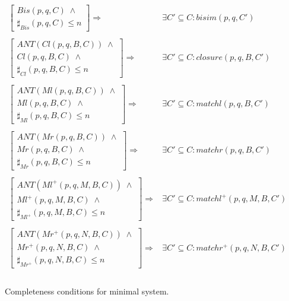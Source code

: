 \begin{figure}
\[
\begin{array}{ll}
\left[\begin{array}{l}Bis(p,q,C)\;\wedge\\ \sharp_{Bis}(p,q,C)\leq n\end{array}\right] \Rightarrow
& \exists C'\subseteq C: bisim(p,q,C')\\
\\

\left[\begin{array}{l}ANT(Cl(p,q,B,C))\;\wedge\\ Cl(p,q,B,C)\;\wedge\\ \sharp_{Cl}(p,q,B,C)\leq n\end{array}\right] \Rightarrow
& \exists C'\subseteq C: closure(p,q,B,C')\\
\\

\left[\begin{array}{l}ANT(Ml(p,q,B,C))\;\wedge\\ Ml(p,q,B,C)\;\wedge\\ \sharp_{Ml}(p,q,B,C)\leq n\end{array}\right] \Rightarrow
& \exists C'\subseteq C: matchl(p,q,B,C')\\
\\

\left[\begin{array}{l}ANT(Mr(p,q,B,C))\;\wedge\\ Mr(p,q,B,C)\;\wedge\\ \sharp_{Mr}(p,q,B,C)\leq n\end{array}\right] \Rightarrow
& \exists C'\subseteq C: matchr(p,q,B,C')\\
\\

\left[\begin{array}{l}ANT(Ml^{+}(p,q,M,B,C))\;\wedge\\ Ml^{+}(p,q,M,B,C)\;\wedge\\ \sharp_{Ml^{+}}(p,q,M,B,C)\leq n\end{array}\right] \Rightarrow
& \exists C'\subseteq C: matchl^{+}(p,q,M,B,C')\\
\\

\left[\begin{array}{l}ANT(Mr^{+}(p,q,N,B,C))\;\wedge\\ Mr^{+}(p,q,N,B,C)\;\wedge\\ \sharp_{Mr^{+}}(p,q,N,B,C)\leq n\end{array}\right] \Rightarrow
& \exists C'\subseteq C: matchr^{+}(p,q,N,B,C')\\
\\

\end{array}
\]
\caption{Completeness conditions for minimal system.\label{figCompletCond}}
\end{figure}

